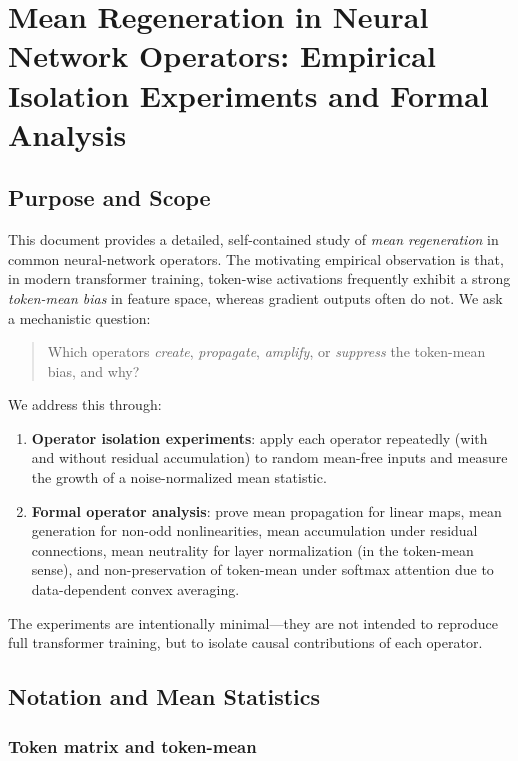 \chapter{Mean Regeneration in Neural Network Operators: Empirical Isolation Experiments and Formal Analysis}

\section{Purpose and Scope}

This document provides a detailed, self-contained study of \emph{mean regeneration} in common neural-network operators.
The motivating empirical observation is that, in modern transformer training, token-wise activations frequently exhibit a strong \emph{token-mean bias} in feature space, whereas gradient outputs often do not.
We ask a mechanistic question:

\begin{quote}
Which operators \emph{create}, \emph{propagate}, \emph{amplify}, or \emph{suppress} the token-mean bias, and why?
\end{quote}

We address this through:
\begin{enumerate}
\item \textbf{Operator isolation experiments}: apply each operator repeatedly (with and without residual accumulation) to random mean-free inputs and measure the growth of a noise-normalized mean statistic.
\item \textbf{Formal operator analysis}: prove mean propagation for linear maps, mean generation for non-odd nonlinearities, mean accumulation under residual connections, mean neutrality for layer normalization (in the token-mean sense), and non-preservation of token-mean under softmax attention due to data-dependent convex averaging.
\end{enumerate}

The experiments are intentionally minimal---they are not intended to reproduce full transformer training, but to isolate causal contributions of each operator.

\section{Notation and Mean Statistics}

\subsection{Token matrix and token-mean}

